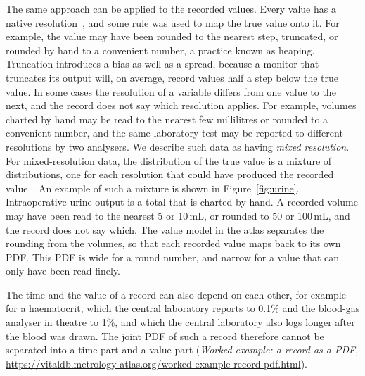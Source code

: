 \documentclass[11pt,a4paper]{article}
\newcommand{\atlaspage}[2]{\emph{#2}, \url{https://vitaldb.metrology-atlas.org/#1.html}}
\begin{document}
The same approach can be applied to the recorded values. Every value has a native resolution~\citep{jcgm-200-2012},
and some rule was used to map the true value onto it. For example, the value may have been rounded to the nearest
step, truncated, or rounded by hand to a convenient number, a practice known as heaping. Truncation introduces a bias
as well as a spread, because a monitor that truncates its output will, on average, record values half a step below
the true value. In some cases the resolution of a variable differs from one value to the next, and the record does not say which
resolution applies. For example, volumes charted by hand may be read to the nearest few millilitres or rounded to a
convenient number, and the same laboratory test may be reported to different resolutions by two analysers. We
describe such data as having \emph{mixed resolution}. For mixed-resolution data, the distribution of the true value
is a mixture of distributions, one for each resolution that could have produced the recorded
value~\citep{heitjan1989grouped,heitjan1991coarse,wang2008heaping}. An example of such a mixture
is shown in Figure~\ref{fig:urine}. Intraoperative urine output is a total that is charted by hand. A recorded volume
may have been read to the nearest 5 or 10\,mL, or rounded to 50 or 100\,mL, and the record does not say which. The
value model in the atlas separates the rounding from the volumes, so that each recorded value maps back to its own
PDF. This PDF is wide for a round number, and narrow for a value that can only have been read finely.

The time and the value of a record can also depend on each other, for example for a haematocrit, which the central
laboratory reports to 0.1\% and the blood-gas analyser in theatre to 1\%, and which the central laboratory also logs
longer after the blood was drawn. The joint PDF of such a record therefore cannot be separated into a time part and a
value part (\atlaspage{worked-example-record-pdf}{Worked example: a record as a PDF}).
\end{document}
